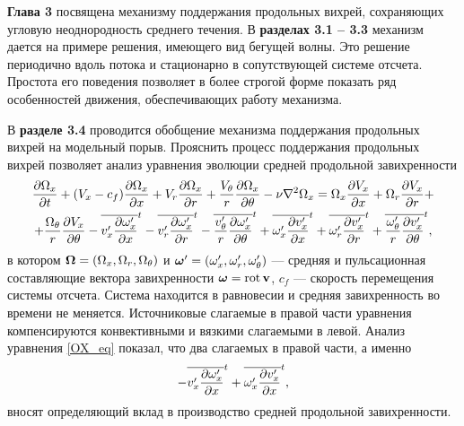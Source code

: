 \textbf{Глава 3} посвящена механизму поддержания продольных вихрей, сохраняющих угловую неоднородность среднего течения. В \textbf{разделах 3.1 -- 3.3} механизм дается на примере решения, имеющего вид бегущей волны. Это решение периодично вдоль потока и стационарно в сопутствующей системе отсчета. Простота его поведения позволяет в более строгой форме показать ряд особенностей движения, обеспечивающих работу механизма. 

В \textbf{разделе 3.4} проводится обобщение механизма поддержания продольных вихрей на модельный порыв. 
Прояснить процесс поддержания продольных вихрей позволяет анализ уравнения эволюции средней продольной завихренности
\begin{multline}\label{OX_eq}
\frac{\partial \Omega_x}{\partial t} + (V_x - c_f)\frac{\partial \Omega_x}{\partial x} + V_r \frac{\partial \Omega_x}{\partial r} + \frac{V_\theta}{r} \frac{\partial \Omega_x}{\partial \theta} - \nu\nabla^2\Omega_x= \Omega_x \frac{\partial V_x}{\partial x} + \Omega_r \frac{\partial V_x}{\partial r} + \\ + \frac{\Omega_\theta}{r} \frac{\partial V_x}{\partial \theta}
 - \overline{v'_x \frac{\partial \omega'_x}{\partial x}}^t - \overline{v'_r \frac{\partial \omega'_x}{\partial r}}^t - \overline{\frac{v'_\theta}{r} \frac{\partial \omega'_x}{\partial \theta}}^t
 + \overline{\omega'_x \frac{\partial v'_x}{\partial x}}^t + \overline{\omega'_r \frac{\partial v'_x}{\partial r}}^t + \overline{\frac{\omega'_\theta}{r} \frac{\partial v'_x}{\partial \theta}}^t,
\end{multline}
в котором $\mbox{\boldmath$\Omega$} = (\Omega_x, \Omega_r, \Omega_\theta)$ и $\mbox{\boldmath$\omega$}' = (\omega'_x, \omega'_r, \omega'_\theta)$ --- средняя и пульсационная составляющие вектора завихренности $\mbox{\boldmath$\omega$} = \mathop{}\!\operatorname{rot} \mathbf{v}$, $c_f$ --- скорость перемещения системы отсчета. Система находится в равновесии и средняя завихренность во времени не меняется. Источниковые слагаемые в правой части уравнения компенсируются конвективными и вязкими слагаемыми в левой. Анализ уравнения \eqref{OX_eq} показал, что два слагаемых в правой части, а именно
\begin{equation}\label{OXgen_terms}
- \overline{v'_x \frac{\partial \omega'_x}{\partial x}}^t + \overline{ \omega'_x \frac{\partial v'_x}{\partial x} }^t,
\end{equation}
вносят определяющий вклад в производство средней продольной завихренности. 

